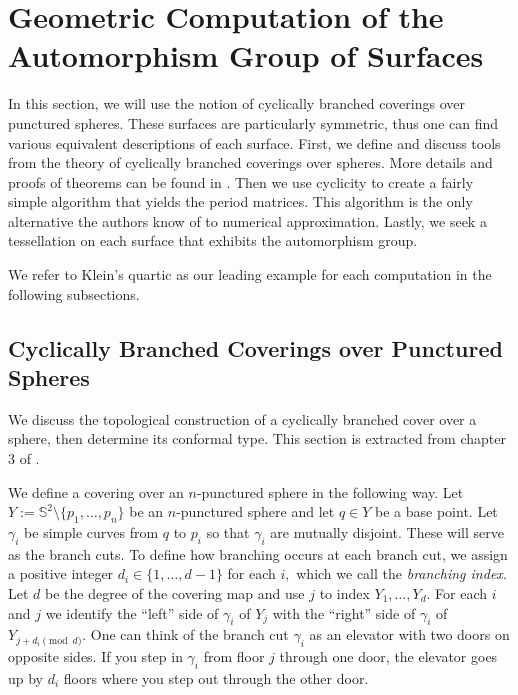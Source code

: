 \documentclass[12pt,reqno]{amsart}
\theoremstyle{definition}
\theoremstyle{remark}
\begin{document}
\section{Geometric Computation of the Automorphism Group of Surfaces}
\label{sec:chap3}

In this section, we will use the notion of cyclically branched coverings over punctured spheres. These surfaces are particularly symmetric, thus one can find various equivalent descriptions of each surface. First, we define and discuss tools from the theory of cyclically branched coverings over spheres. More details and proofs of theorems can be found in \cite{dthesis}. Then we use cyclicity to create a fairly simple algorithm that yields the period matrices. This algorithm is the only alternative the authors know of to numerical approximation. Lastly, we seek a tessellation on each surface that exhibits the automorphism group.

We refer to Klein's quartic as our leading example for each computation in the following subsections.


\subsection{Cyclically Branched Coverings over Punctured Spheres}

We discuss the topological construction of a cyclically branched cover over a sphere, then determine its conformal type. This section is extracted from chapter 3 of \cite{dthesis}.

We define a covering over an $n$-punctured sphere in the following way. Let $Y := \mathbb{S}^2 \setminus \{p_1, \ldots , p_n\}$ be an $n$-punctured sphere and let $q \in Y$ be a base point. Let $\gamma_i$ be simple curves from $q$ to $p_i$ so that $\gamma_i$ are mutually disjoint. These will serve as the branch cuts. To define how branching occurs at each branch cut, we assign a positive integer $d_i \in \{1, \ldots, d - 1\}$ for each $i,$ which we call the \textit{branching index.} Let $d$ be the degree of the covering map and use $j$ to index $Y_1, \ldots , Y_d.$ For each $i$ and $j$ we identify the ``left'' side of $\gamma_i$ of $Y_j$ with the ``right'' side of $\gamma_i$ of $Y_{j + d_i \pmod d}.$ One can think of the branch cut $\gamma_i$ as an elevator with two doors on opposite sides. If you step in $\gamma_i$ from floor $j$ through one door, the elevator goes up by $d_i$ floors where you step out through the other door. 
\end{document}
